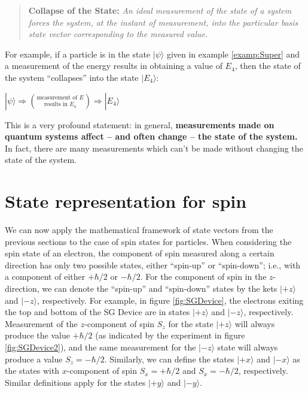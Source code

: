 \begin{quote}
{\bf Collapse of the State:}  {\em An ideal measurement of the state of a system forces the system, at the instant of measurement, into the particular basis state vector corresponding to the measured value.}
\end{quote}

For example, if a particle is in the state $|\mbox{$\psi$}\rangle$  given in example \ref{examp:Super} and a measurement of the energy results in obtaining a value of $E_4$, then the state of the system ``collapses'' into the state $|\mbox{$E_4$}\rangle$:

\begin{center}
$|\mbox{$\psi$}\rangle  \Longrightarrow  {\mbox{measurement of $E$} \choose \mbox{results in $E_4$}}  \Longrightarrow  |\mbox{$E_4$}\rangle $
\end{center}

This is a very profound statement: in general, {\bf measurements
made on quantum systems affect -- and often change -- the state of
the system.}  In fact, there are many measurements which can't be
made without changing the state of the system.

\section{State representation for spin}

We can now apply the mathematical framework of state vectors from the previous sections to the case of spin states for particles.  When considering the spin state of an electron, the
component of spin measured along a certain direction has only two possible states, either ``spin-up'' or ``spin-down''; i.e.,
with a component of either $+\hbar/2$ or $-\hbar/2$. For the component of spin in the $z$-direction, we can denote the
``spin-up'' and ``spin-down'' states by the kets $|\mbox{$+z$}\rangle$ and
$|\mbox{$-z$}\rangle$, respectively.  For example, in figure \ref{fig:SGDevice}, the electrons exiting the top and bottom of the SG Device are in states $|\mbox{$+z$}\rangle$ and $|\mbox{$-z$}\rangle$, respectively.  Measurement of the $z$-component
of spin $S_z$ for the state $|\mbox{$+z$}\rangle$ will always produce
the value $+\hbar/2$ (as indicated by the experiment in figure \ref{fig:SGDevice2}), and the same measurement for the
$|\mbox{$-z$}\rangle$ state will always produce a value $S_z =
-\hbar/2$.  Similarly, we can define the states $|\mbox{$+x$}\rangle$
and $|\mbox{$-x$}\rangle$ as the states with $x$-component of spin $S_x = +\hbar/2$ and $S_x
= -\hbar/2$, respectively.  Similar definitions apply for the states
$|\mbox{$+y$}\rangle$ and $|\mbox{$-y$}\rangle$.

